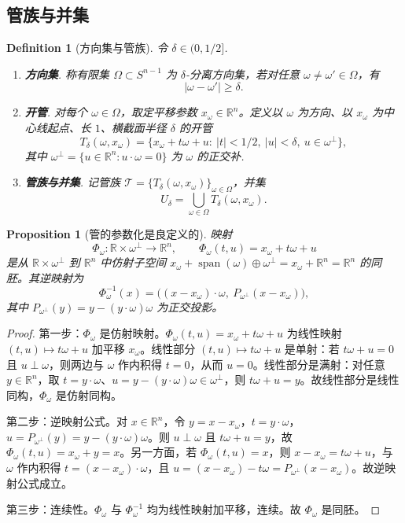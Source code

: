 \documentclass[11pt,a4paper]{article}
\newtheorem{proposition}[theorem]{Proposition}
\newtheorem{definition}[theorem]{Definition}
\theoremstyle{remark}
\begin{document}
	\subsection{管族与并集}
	\begin{definition}[方向集与管族]
		\label{def:tube-family}
		令 $\delta\in(0,1/2]$.
		\begin{enumerate}
			\item[(a)] \textbf{方向集}. 称有限集 $\Omega\subset S^{n-1}$ 为 \textit{$\delta$-分离方向集}，若对任意 $\omega\neq\omega'\in\Omega$，有
			\[
			|\omega-\omega'|\ge\delta.
			\]
			\item[(b)] \textbf{开管}. 对每个 $\omega\in\Omega$，取定平移参数 $x_\omega\in\mathbb R^n$。定义以 $\omega$ 为方向、以 $x_\omega$ 为中心线起点、长 $1$、横截面半径 $\delta$ 的开管
			\[
			T_\delta(\omega,x_\omega)=\{x_\omega+t\omega+u:\ |t|<1/2,\ |u|<\delta,\ u\in\omega^\perp\},
			\]
			其中 $\omega^\perp=\{u\in\mathbb R^n:u\cdot\omega=0\}$ 为 $\omega$ 的正交补.
			
			\item[(c)] \textbf{管族与并集}. 记管族 $\mathcal T=\{T_\delta(\omega,x_\omega)\}_{\omega\in\Omega}$，并集
			\[
			U_\delta=\bigcup_{\omega\in\Omega}T_\delta(\omega,x_\omega).
			\]
		\end{enumerate}
	\end{definition}
	
	\begin{proposition}[管的参数化是良定义的]
		映射
		\[
		\Phi_\omega:\mathbb R\times\omega^\perp\to\mathbb R^n,\qquad
		\Phi_\omega(t,u)=x_\omega+t\omega+u
		\]
		是从 $\mathbb R\times\omega^\perp$ 到 $\mathbb R^n$ 中仿射子空间 $x_\omega+\operatorname{span}(\omega)\oplus\omega^\perp=x_\omega+\mathbb R^n=\mathbb R^n$ 的同胚。其逆映射为
		\[
		\Phi_\omega^{-1}(x)=\bigl((x-x_\omega)\cdot\omega,\ P_{\omega^\perp}(x-x_\omega)\bigr),
		\]
		其中 $P_{\omega^\perp}(y)=y-(y\cdot\omega)\omega$ 为正交投影。
	\end{proposition}
	
	\begin{proof}
		第一步：$\Phi_\omega$ 是仿射映射。$\Phi_\omega(t,u)=x_\omega+t\omega+u$ 为线性映射 $(t,u)\mapsto t\omega+u$ 加平移 $x_\omega$。线性部分 $(t,u)\mapsto t\omega+u$ 是单射：若 $t\omega+u=0$ 且 $u\perp\omega$，则两边与 $\omega$ 作内积得 $t=0$，从而 $u=0$。线性部分是满射：对任意 $y\in\mathbb R^n$，取 $t=y\cdot\omega$、$u=y-(y\cdot\omega)\omega\in\omega^\perp$，则 $t\omega+u=y$。故线性部分是线性同构，$\Phi_\omega$ 是仿射同构。
		
		第二步：逆映射公式。对 $x\in\mathbb R^n$，令 $y=x-x_\omega$，$t=y\cdot\omega$，$u=P_{\omega^\perp}(y)=y-(y\cdot\omega)\omega$。则 $u\perp\omega$ 且 $t\omega+u=y$，故 $\Phi_\omega(t,u)=x_\omega+y=x$。另一方面，若 $\Phi_\omega(t,u)=x$，则 $x-x_\omega=t\omega+u$，与 $\omega$ 作内积得 $t=(x-x_\omega)\cdot\omega$，且 $u=(x-x_\omega)-t\omega=P_{\omega^\perp}(x-x_\omega)$。故逆映射公式成立。
		
		第三步：连续性。$\Phi_\omega$ 与 $\Phi_\omega^{-1}$ 均为线性映射加平移，连续。故 $\Phi_\omega$ 是同胚。
	\end{proof}
	
\end{document}

